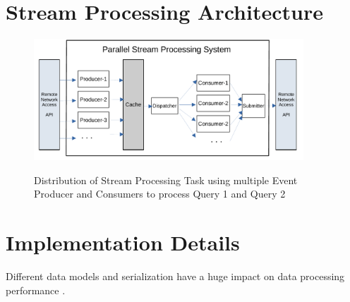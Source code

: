 \section{Stream Processing Architecture}\label{sec:concepts}


\begin{figure}[!ht]
    \begin{center}
        \includegraphics[width=0.9\textwidth]{./images/Parallel-Stream-Processing-System}
        \label{fig:parallel-srream-processing}
        \caption{Distribution of Stream Processing Task using multiple Event Producer and Consumers to process Query 1 and Query 2 }
    \end{center}
\end{figure}



\section{Implementation Details}\label{sec:implementation}



Different data models and serialization have a huge impact on data processing performance \cite{DBLP:conf/cloud/SikdarTJ17}. 





